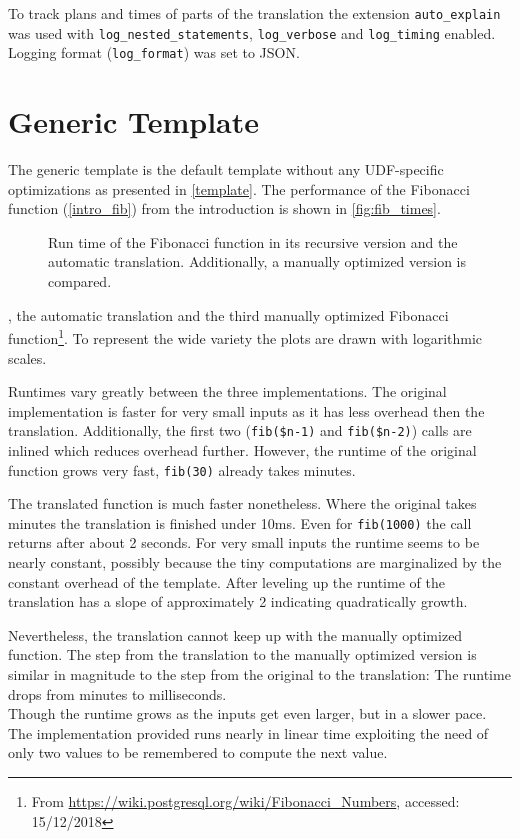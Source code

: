 To track plans and times of parts of the translation the extension \texttt{auto\_explain} was used with \texttt{log\_nested\_statements}, \texttt{log\_verbose} and \texttt{log\_timing} enabled. Logging format (\texttt{log\_format}) was set to JSON.

\section{Generic Template}

The generic template is the default template without any UDF-specific optimizations as presented in \autoref{template}. The performance of the Fibonacci function (\autoref{intro_fib}) from the introduction is shown in \autoref{fig:fib_times}.

\begin{figure}[h!]
    \centering\small
    
    \caption{Run time of the Fibonacci function in its recursive version and the automatic translation. Additionally, a manually optimized version is compared.}
    \label{fig:fib_times}
\end{figure}

, the automatic translation and the third manually optimized Fibonacci function\footnote{From \url{https://wiki.postgresql.org/wiki/Fibonacci_Numbers}, accessed: 15/12/2018}. To represent the wide variety the plots are drawn with logarithmic scales.

Runtimes vary greatly between the three implementations. The original implementation is faster for very small inputs as it has less overhead then the translation. Additionally, the first two (\texttt{fib(\$n-1)} and \texttt{fib(\$n-2)}) calls are inlined which reduces overhead further. However, the runtime of the original function grows very fast, \texttt{fib(30)} already takes minutes.

The translated function is much faster nonetheless. Where the original takes minutes the translation is finished under 10ms. Even for \texttt{fib(1000)} the call returns after about 2 seconds. For very small inputs the runtime seems to be nearly constant, possibly because the tiny computations are marginalized by the constant overhead of the template. After leveling up the runtime of the translation has a slope of approximately 2 indicating quadratically growth.

Nevertheless, the translation cannot keep up with the manually optimized function. The step from the translation to the manually optimized version is similar in magnitude to the step from the original to the translation: The runtime drops from minutes to milliseconds.\\
Though the runtime grows as the inputs get even larger, but in a slower pace. The implementation provided runs nearly in linear time exploiting the need of only two values to be remembered to compute the next value.\\

